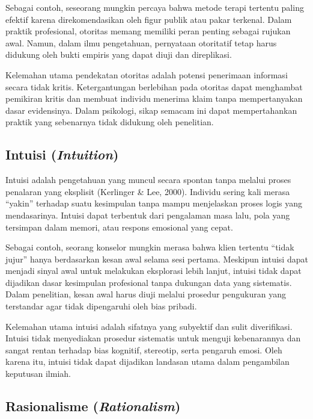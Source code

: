 \documentclass[
  indonesian,
  letterpaper,
  DIV=11,
  numbers=noendperiod]{scrreprt}
\begin{document}
Sebagai contoh, seseorang mungkin percaya bahwa metode terapi tertentu
paling efektif karena direkomendasikan oleh figur publik atau pakar
terkenal. Dalam praktik profesional, otoritas memang memiliki peran
penting sebagai rujukan awal. Namun, dalam ilmu pengetahuan, pernyataan
otoritatif tetap harus didukung oleh bukti empiris yang dapat diuji dan
direplikasi.

Kelemahan utama pendekatan otoritas adalah potensi penerimaan informasi
secara tidak kritis. Ketergantungan berlebihan pada otoritas dapat
menghambat pemikiran kritis dan membuat individu menerima klaim tanpa
mempertanyakan dasar evidensinya. Dalam psikologi, sikap semacam ini
dapat mempertahankan praktik yang sebenarnya tidak didukung oleh
penelitian.

\subsection{\texorpdfstring{Intuisi
(\emph{Intuition})}{Intuisi (Intuition)}}\label{intuisi-intuition}

Intuisi adalah pengetahuan yang muncul secara spontan tanpa melalui
proses penalaran yang eksplisit (Kerlinger \& Lee, 2000). Individu
sering kali merasa ``yakin'' terhadap suatu kesimpulan tanpa mampu
menjelaskan proses logis yang mendasarinya. Intuisi dapat terbentuk dari
pengalaman masa lalu, pola yang tersimpan dalam memori, atau respons
emosional yang cepat.

Sebagai contoh, seorang konselor mungkin merasa bahwa klien tertentu
``tidak jujur'' hanya berdasarkan kesan awal selama sesi pertama.
Meskipun intuisi dapat menjadi sinyal awal untuk melakukan eksplorasi
lebih lanjut, intuisi tidak dapat dijadikan dasar kesimpulan profesional
tanpa dukungan data yang sistematis. Dalam penelitian, kesan awal harus
diuji melalui prosedur pengukuran yang terstandar agar tidak dipengaruhi
oleh bias pribadi.

Kelemahan utama intuisi adalah sifatnya yang subyektif dan sulit
diverifikasi. Intuisi tidak menyediakan prosedur sistematis untuk
menguji kebenarannya dan sangat rentan terhadap bias kognitif,
stereotip, serta pengaruh emosi. Oleh karena itu, intuisi tidak dapat
dijadikan landasan utama dalam pengambilan keputusan ilmiah.

\subsection{\texorpdfstring{Rasionalisme
(\emph{Rationalism})}{Rasionalisme (Rationalism)}}\label{rasionalisme-rationalism}
\end{document}
